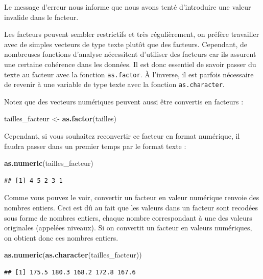 \documentclass[
  11pt,
  french,
]{book}
\makeatletter
\newenvironment{Shaded}{\begin{snugshade}}{\end{snugshade}}
\newcommand{\KeywordTok}[1]{\textcolor[rgb]{0.13,0.29,0.53}{\textbf{#1}}}
\newcommand{\NormalTok}[1]{#1}
\newcommand{\StringTok}[1]{\textcolor[rgb]{0.31,0.60,0.02}{#1}}
\newenvironment{kframe}{%
\medskip{}
\setlength{\fboxsep}{.8em}
 \def\at@end@of@kframe{}%
 \ifinner\ifhmode%
  \def\at@end@of@kframe{\end{minipage}}%
  \begin{minipage}{\columnwidth}%
 \fi\fi%
 \def\FrameCommand##1{\hskip\@totalleftmargin \hskip-\fboxsep
 \colorbox{shadecolor}{##1}\hskip-\fboxsep
     \hskip-\linewidth \hskip-\@totalleftmargin \hskip\columnwidth}%
 \MakeFramed {\advance\hsize-\width
   \@totalleftmargin\z@ \linewidth\hsize
   \@setminipage}}%
 {\par\unskip\endMakeFramed%
 \at@end@of@kframe}
\newenvironment{kframev}{%
\medskip{}
\setlength{\fboxsep}{.8em}
 \def\at@end@of@kframev{}%
 \ifinner\ifhmode%
  \def\at@end@of@kframev{\end{minipage}}%
  \begin{minipage}{\columnwidth}%
 \fi\fi%
 \def\FrameCommand##1{\hskip\@totalleftmargin \hskip-\fboxsep
 \colorbox{shadebluecolor}{##1}\hskip-\fboxsep
     \hskip-\linewidth \hskip-\@totalleftmargin \hskip\columnwidth}%
 \MakeFramed {\advance\hsize-\width
   \@totalleftmargin\z@ \linewidth\hsize
   \@setminipage}}%
 {\par\unskip\endMakeFramed%
 \at@end@of@kframev}
\renewenvironment{Shaded}{\begin{kframe}}{\end{kframe}}
\newenvironment{rmdblock}[1]
  {
  \begin{itemize}
  \renewcommand{\labelitemi}{
    \raisebox{-.7\height}[0pt][0pt]{
      {\setkeys{Gin}{width=3em,keepaspectratio}\texttt{[image: images/\#1]}}
    }
  }
  \setlength{\fboxsep}{1em}
  \begin{kframev}
  \small
  \item
  }
  {
  \end{kframev}
  \end{itemize}
  }
\newenvironment{bloc_attention}
  {\begin{rmdblock}{attention}}
  {\end{rmdblock}}
\makeatother
\begin{document}
\begin{bloc_attention}
Le message d'erreur nous informe que nous avons tenté d'introduire une valeur invalide dans le facteur.

Les facteurs peuvent sembler restrictifs et très régulièrement, on préfère travailler avec de simples vecteurs de type texte plutôt que des facteurs. Cependant, de nombreuses fonctions d'analyse nécessitent d'utiliser des facteurs car ils assurent une certaine cohérence dans les données. Il est donc essentiel de savoir passer du texte au facteur avec la fonction \texttt{as.factor}. À l'inverse, il est parfois nécessaire de revenir à une variable de type texte avec la fonction \texttt{as.character}.

Notez que des vecteurs numériques peuvent aussi être convertis en facteurs :

\begin{Shaded}
\begin{Highlighting}[]
\NormalTok{tailles_facteur <-}\StringTok{ }\KeywordTok{as.factor}\NormalTok{(tailles)}
\end{Highlighting}
\end{Shaded}

Cependant, si vous souhaitez reconvertir ce facteur en format numérique, il faudra passer dans un premier temps par le format texte :

\begin{Shaded}
\begin{Highlighting}[]
\KeywordTok{as.numeric}\NormalTok{(tailles_facteur)}
\end{Highlighting}
\end{Shaded}

\begin{verbatim}
## [1] 4 5 2 3 1
\end{verbatim}

Comme vous pouvez le voir, convertir un facteur en valeur numérique renvoie des nombres entiers. Ceci est dû au fait que les valeurs dans un facteur sont recodées sous forme de nombres entiers, chaque nombre correspondant à une des valeurs originales (appelées niveaux). Si on convertit un facteur en valeurs numériques, on obtient donc ces nombres entiers.

\begin{Shaded}
\begin{Highlighting}[]
\KeywordTok{as.numeric}\NormalTok{(}\KeywordTok{as.character}\NormalTok{(tailles_facteur))}
\end{Highlighting}
\end{Shaded}

\begin{verbatim}
## [1] 175.5 180.3 168.2 172.8 167.6
\end{verbatim}


\end{bloc_attention}
\end{document}
